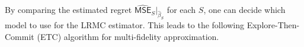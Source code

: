 \documentclass[a4paper,11pt]{article}
\numberwithin{equation}{section}
\theoremstyle{plain}
\theoremstyle{definition}
\def\P{{\mathbb P}}
\def\mse{{\textsf{MSE}}}
\begin{document}
By comparing the estimated regret $\widehat{\mse}_S|_{\widehat{\beta}_S}$ for each $S$, one can decide which model to use for the LRMC estimator. This leads to the following Explore-Then-Commit (ETC) algorithm for multi-fidelity approximation.



\end{document}
